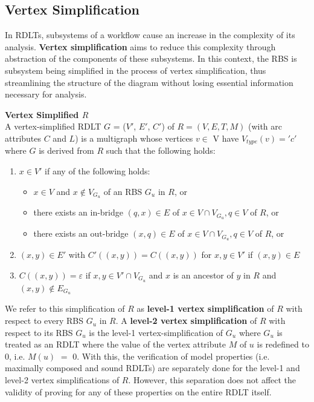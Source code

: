 \subsection*{Vertex Simplification}
In RDLTs, subsystems of a workflow cause an increase in the complexity of its analysis. \textbf{Vertex simplification} aims to reduce this complexity through abstraction of the components of these subsystems. In this context, the RBS is subsystem being simplified in the process of vertex simplification, thus streamlining the structure of the diagram without losing essential information necessary for analysis.
\begin{defn}\textbf{Vertex Simplified $R$} \cite{Malinao2017}\\
    \label{VertexSimpDef}
     A vertex-simplified RDLT $ G $ = ($ V' $, $ E' $, $ C' $) of $ R = (V, E, T, M) $ (with arc attributes $ C $ and $ L $) is a multigraph whose vertices $ v \in $ V have $ V_{type}(v) = 'c' $ where $ G $ is derived from $ R $ such that the following holds:
     \begin{enumerate}
         \item $ x \in V' $ if any of the following holds:
         \begin{itemize}
             \item $ x \in V $ and $ x \notin V_{G_u} $ of an RBS $ G_u $ in $ R $, or
             \item there exists an in-bridge $ (q, x) \in E $ of $ x \in V \cap V_{G_u}, q \in V $ of $ R $, or
             \item there exists an out-bridge $ (x, q) \in E $ of $ x \in V \cap V_{G_u}, q \in V $ of $ R $, or
         \end{itemize}
         \item $ (x, y) \in E' $ with $ C'((x, y)) = C((x, y)) $ for $ x, y \in V' $ if $ (x, y) \in E $
         \item $ C((x, y)) = \varepsilon $ if $ x, y \in V' \cap V_{G_u} $ and $ x $ is an ancestor of $ y $ in $ R $ and $ (x, y) \notin E_{G_u} $  
     \end{enumerate}

     We refer to this simplification of $ R $ as \textbf{level-1 vertex simplification} of $ R $ with respect to every RBS $ G_u $ in $ R $. A \textbf{level-2 vertex simplification} of $ R $ with respect to its RBS $ G_u $ is the level-1 vertex-simplification of $ G_u $ where $ G_u $ is treated as an RDLT where the value of the vertex attribute $ M $ of $ u $ is redefined to $ 0 $, i.e. $ M(u) $ $ = $ $ 0 $. With this, the verification of model properties (i.e. maximally composed and sound RDLTs) are separately done for the level-1 and level-2 vertex simplifications of $ R $. However, this separation does not affect the validity of proving for any of these properties on the entire RDLT itself. 
 \end{defn}

